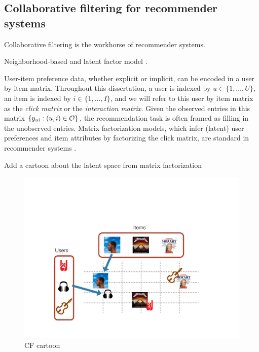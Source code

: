 \subsection{Collaborative filtering for recommender systems} \label{chpt:background:sec:cf}

\PP Collaborative filtering is the workhorse of recommender systems.

\PP Neighborhood-based \citep{sarwar2001item} and latent factor model \citep{koren2009matrix}.

 User-item preference data, whether explicit or implicit, can be encoded in a user by item matrix. Throughout this dissertation, a user is indexed by $u \in \{1, \dots, U\}$, an item is indexed by $i \in \{1, \dots, I\}$, and we will refer to this user by item matrix as the \emph{click matrix} or the \emph{interaction matrix}. Given the observed entries in this matrix $\{y_{ui}: (u, i) \in \mathcal{O}\}$, the recommendation task is often framed as filling in the unobserved entries.  Matrix factorization models, which infer (latent) user preferences and item attributes by factorizing the click matrix, are standard in recommender systems \citep{koren2009matrix}. 

\PP Add a cartoon about the latent space from matrix factorization

\begin{figure}
  \centering
    \includegraphics[width=\textwidth]{fig/cf_cartoon}
      \caption{CF cartoon}
      \label{chpt:background:fig:cf_cartoon}
\end{figure}


